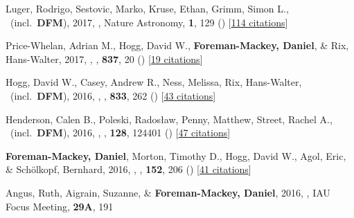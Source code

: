 \item[{\color{numcolor}\scriptsize26}] Luger, Rodrigo, Sestovic, Marko, Kruse, Ethan, Grimm, Simon L., \etal\ (incl.\ \textbf{DFM}), 2017, , Nature Astronomy, \textbf{1}, 129 () [\href{http://adsabs.harvard.edu/abs/2017NatAs...1E.129L}{114 citations}]

\item[{\color{numcolor}\scriptsize25}] Price-Whelan, Adrian M., Hogg, David W., \textbf{Foreman-Mackey, Daniel}, \& Rix, Hans-Walter, 2017, , \apj, \textbf{837}, 20 () [\href{http://adsabs.harvard.edu/abs/2017ApJ...837...20P}{19 citations}]

\item[{\color{numcolor}\scriptsize24}] Hogg, David W., Casey, Andrew R., Ness, Melissa, Rix, Hans-Walter, \etal\ (incl.\ \textbf{DFM}), 2016, , \apj, \textbf{833}, 262 () [\href{http://adsabs.harvard.edu/abs/2016ApJ...833..262H}{43 citations}]

\item[{\color{numcolor}\scriptsize23}] Henderson, Calen B., Poleski, Rados{\l}aw, Penny, Matthew, Street, Rachel A., \etal\ (incl.\ \textbf{DFM}), 2016, , \pasp, \textbf{128}, 124401 () [\href{http://adsabs.harvard.edu/abs/2016PASP..128l4401H}{47 citations}]

\item[{\color{numcolor}\scriptsize22}] \textbf{Foreman-Mackey, Daniel}, Morton, Timothy D., Hogg, David W., Agol, Eric, \& Sch{\"o}lkopf, Bernhard, 2016, , \aj, \textbf{152}, 206 () [\href{http://adsabs.harvard.edu/abs/2016AJ....152..206F}{41 citations}]

\item[{\color{numcolor}\scriptsize21}] Angus, Ruth, Aigrain, Suzanne, \& \textbf{Foreman-Mackey, Daniel}, 2016, , IAU Focus Meeting, \textbf{29A}, 191

